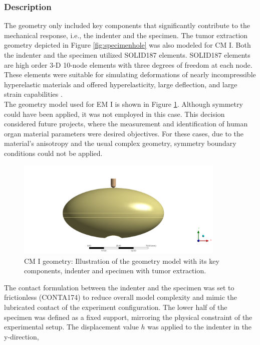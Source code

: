 \subsubsection*{Description}
The geometry only included key components that significantly contribute to the mechanical response,
i.e., the indenter and the specimen. The tumor extraction geometry depicted in Figure \ref{fig:specimenhole}
was also modeled for CM I. Both the indenter and the specimen utilized SOLID187 elements.
SOLID187 elements are high order 3-D \SI{10}{}-node elements with three degrees of freedom at each node.
These elements were suitable for simulating deformations of nearly incompressible hyperelastic materials 
and offered hyperelasticity, large deflection, and large strain capabilities \cite{Ansys2010}.\\
The geometry model used for EM I is shown in Figure \ref{fig:geometrycpI}. %
Although symmetry could have been applied, it was not employed in this case. This decision considered 
future projects, where the measurement and identification of human organ material parameters were desired 
objectives. For these cases, due to the material's anisotropy and the usual complex geometry,
symmetry boundary conditions could not be applied. 
\begin{figure}%
    \centering
   \quad
   \includegraphics[width=10cm]{Images/computational/Assemblynoplatform2.png}%
   \caption[Computational model I geometry]{CM I geometry: Illustration of the geometry model with its key components, indenter and specimen with tumor extraction.}%
   \label{fig:geometrycpI}%
\end{figure}
The contact formulation between the indenter and the specimen was set to frictionless (CONTA174) to reduce
overall model complexity and mimic the lubricated contact of the experiment configuration.
The lower half of the specimen was defined as a fixed support, mirroring the physical constraint of the 
experimental setup. The displacement value $h$ was applied to the indenter in the y-direction,
